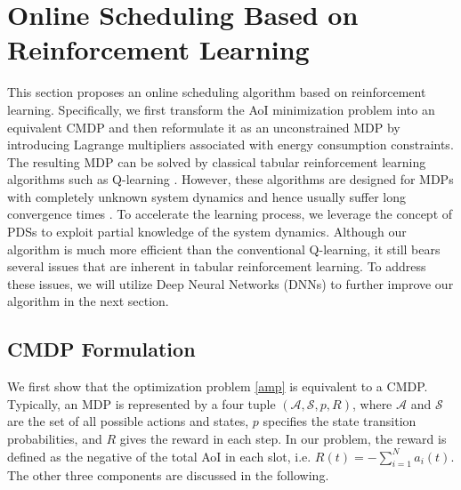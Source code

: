 \documentclass[lettersize, journal]{IEEEtran}
\begin{document}
\section{Online Scheduling Based on Reinforcement Learning} \label{section:algorithm_design}
This section proposes an online scheduling algorithm based on reinforcement learning.
Specifically, we first transform the AoI minimization problem into an equivalent CMDP
and then reformulate it as an unconstrained MDP by introducing Lagrange multipliers associated with 
energy consumption constraints.
The resulting MDP can be solved by classical tabular reinforcement learning algorithms such as Q-learning \cite{watkins1992q}.
However, these algorithms are designed for MDPs with completely unknown system dynamics and hence usually
suffer long convergence times \cite{jaksch2010near, even2004learning}.
To accelerate the learning process,
we leverage the concept of PDSs \cite{salodkar2008line,mastronarde2012joint} to exploit partial knowledge of the system dynamics.
Although our algorithm is much more efficient than the conventional Q-learning,
it still bears several issues that are inherent in tabular reinforcement learning.
To address these issues, we will utilize Deep Neural Networks (DNNs) to further improve our algorithm in the next section.

\subsection{CMDP Formulation} \label{subsection:cmdp_formulation}
We first show that the optimization problem \eqref{amp} is equivalent to a CMDP.
Typically, an MDP is represented by a four tuple $(\mathcal{A}, \mathcal{S}, p, R)$,
where $\mathcal{A}$ and $\mathcal{S}$ are the set of all possible actions and states,
$p$ specifies the state transition probabilities,
and $R$ gives the reward in each step.
In our problem, the reward is defined as the negative of the total AoI in each slot, i.e. $R(t) = - \sum_{i=1}^N a_i(t)$.
The other three components are discussed in the following.
\end{document}
